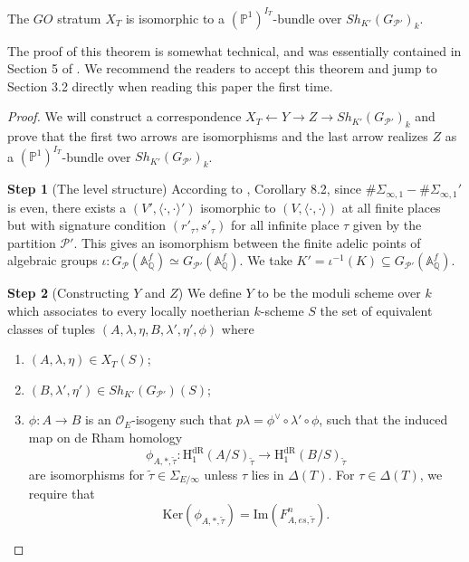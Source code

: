 \documentclass{article}
\begin{document}
\begin{theorem}\label{description}
	The $GO$ stratum $X_T$ is isomorphic to a $(\mathbb{P}^1)^{I_T}$-bundle over $Sh_{K'}(G_{\mathcal{P}'})_k$. 
\end{theorem}

The proof of this theorem is somewhat technical, and was essentially contained in Section 5 of \citep{Tian-Xiao}. We recommend the readers to accept this theorem and jump to Section 3.2 directly when reading this paper the first time.

\begin{proof}
	We will construct a correspondence $X_T\leftarrow Y\rightarrow Z\rightarrow Sh_{K'}(G_{\mathcal{P}'})_k$ and prove that the first two arrows are isomorphisms and the last arrow realizes $Z$ as a $(\mathbb{P}^1)^{I_T}$-bundle over $Sh_{K'}(G_{\mathcal{P}'})_k$.



\medskip
\noindent
\textbf{Step 1} (The level structure) According to \citep{Helm}, Corollary 8.2, since $\#\Sigma_{\infty,1}-\#\Sigma_{\infty,1}'$ is even, there exists a $(V',\langle\cdot,\cdot\rangle')$ isomorphic to $(V,\langle\cdot,\cdot\rangle)$ at all finite places but with signature condition $(r'_\tau,s'_\tau)$ for all infinite place $\tau$ given by the partition $\mathcal{P}'$. This gives an isomorphism between the finite adelic points of algebraic groups $\iota:G_{\mathcal{P}}(\mathbb{A}^f_{\mathbb{Q}})\simeq G_{\mathcal{P}'}(\mathbb{A}^f_{\mathbb{Q}})$. We take $K'=\iota^{-1}(K)\subseteq G_{\mathcal{P}'}(\mathbb{A}^f_\mathbb{Q})$.



\medskip
\noindent
\textbf{Step 2} (Constructing $Y$ and $Z$) We define $Y$ to be the moduli scheme over $k$ which associates to every locally noetherian $k$-scheme $S$ the set of equivalent classes of tuples $(A,\lambda,\eta,B,\lambda',\eta',\phi)$ where
\begin{enumerate}
	\item $(A,\lambda,\eta)\in X_T(S)$;
	\item $(B,\lambda',\eta')\in Sh_{K'}(G_{\mathcal{P}'})(S)$;
	\item $\phi:A\to B$ is an $\mathcal{O}_E$-isogeny such that $p\lambda=\phi^\vee\circ\lambda'\circ\phi$, such that the induced map on de Rham homology
\begin{equation}
\phi_{A,\ast,\tilde\tau}:\text{H}_1^{\text{dR}}(A/S)_{\tilde\tau}\to \text{H}_1^{\text{dR}}(B/S)_{\tilde\tau}
\end{equation}
are isomorphisms for $\tilde\tau\in\Sigma_{E/\infty}$ unless $\tau$ lies in $\Delta(T)$. For $\tau\in\Delta(T)$, we require that
\begin{equation}
\text{Ker}(\phi_{A,\ast,\tilde\tau})=\text{Im}(F^n_{A,es,\tilde\tau}).
\end{equation}


\end{enumerate}
\end{proof}
\end{document}
